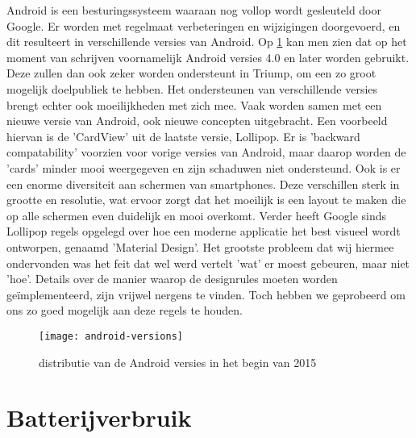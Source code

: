 Android is een besturingssysteem waaraan nog vollop wordt gesleuteld door Google. Er worden met regelmaat verbeteringen en wijzigingen doorgevoerd, en dit resulteert in verschillende versies van Android.
Op \ref{fig:android_versions} kan men zien dat op het moment van schrijven voornamelijk Android versies 4.0 en later worden gebruikt. Deze zullen dan ook zeker worden ondersteunt in Triump, om een zo groot mogelijk doelpubliek te hebben. Het ondersteunen van verschillende versies brengt echter ook moeilijkheden met zich mee. Vaak worden samen met een nieuwe versie van Android, ook nieuwe concepten uitgebracht.
Een voorbeeld hiervan is de 'CardView' uit de laatste versie, Lollipop. Er is 'backward compatability' voorzien voor vorige versies van Android, maar daarop worden de 'cards' minder mooi weergegeven en zijn schaduwen niet ondersteund.
Ook is er een enorme diversiteit aan schermen van smartphones. Deze verschillen sterk in grootte en resolutie, wat ervoor zorgt dat het moeilijk is een layout te maken die op alle schermen even duidelijk en mooi overkomt.
Verder heeft Google sinds Lollipop regels opgelegd over hoe een moderne applicatie het best visueel wordt ontworpen, genaamd 'Material Design'. Het grootste probleem dat wij hiermee ondervonden was het feit dat wel werd vertelt 'wat' er moest gebeuren, maar niet 'hoe'. Details over de manier waarop de designrules moeten worden geïmplementeerd, zijn vrijwel nergens te vinden. Toch hebben we geprobeerd om ons zo goed mogelijk aan deze regels te houden.
\begin{figure}[H]
	\centering
	\texttt{[image: android-versions]}
	\caption{distributie van de Android versies in het begin van 2015}
	\label{fig:android_versions}
\end{figure}

\section{Batterijverbruik}




